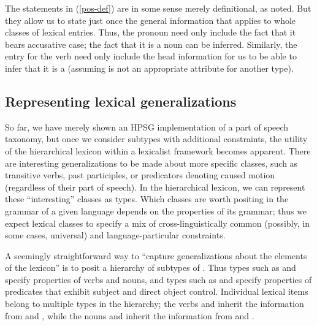 \documentclass[output=paper
 	        ,biblatex
                ,babelshorthands
                ,newtxmath
                ,draftmode
                ,colorlinks, citecolor=brown
]{langscibook}
\begin{document}
The statements in (\ref{pos-def}) are in some sense merely definitional, as noted.
But they allow us to state just once the general information that applies to whole classes of lexical entries.
Thus, the pronoun  need only include the fact that it bears accusative case; the fact that it is a noun can be inferred. 
Similarly, the entry for the verb  need only include the head information \avm{[aux & $+$]} for us to be able to infer that it is a  (assuming  is not an appropriate attribute for another type).

\subsection{Representing lexical generalizations}

So far, we have merely shown an HPSG implementation of a part of speech taxonomy, but once we consider subtypes with additional constraints, the utility of the hierarchical lexicon within a lexicalist framework becomes apparent.
There are interesting generalizations to be made about more specific classes, such as transitive verbs, past participles, or predicators denoting caused motion (regardless of their part of speech).
In the hierarchical lexicon, we can represent these ``interesting'' classes as types.
Which classes are worth positing in the grammar of a given language depends on the properties of its grammar; thus we expect lexical classes to specify a mix of cross-linguistically common (possibly, in some cases, universal) and language-particular constraints.

A seemingly straightforward way to ``capture generalizations about the elements of the lexicon'' is to posit a hierarchy of subtypes of .
Thus types such as  and   specify properties of verbs and nouns, and types such	as  and  specify properties of predicates that exhibit subject and direct object control.
Individual lexical items belong to multiple types in the hierarchy; the verbs  and  inherit the information from  and , while the nouns  and  inherit the information from  and .
\end{document}
